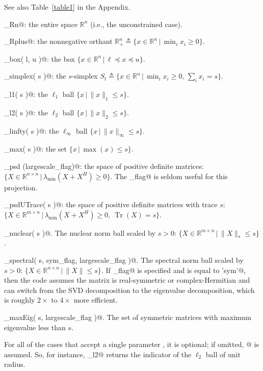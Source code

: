 \documentclass{article}
\newcommand{\<}{\langle}
\renewcommand{\>}{\rangle}
\newcommand{\R}{\mathbb{R}}
\begin{document}
See also Table~\ref{table1} in the Appendix. %
\begin{trivlist}
\item \verb@proj_Rn@: the entire space $\R^n$ (i.e., the unconstrained case).
\item \verb@proj_Rplus@: the nonnegative orthant $\R^n_+\triangleq\{x\in\R^n\,|\,\min_i x_i\geq 0\}$.
\item \verb@proj_box( l, u )@: the box $\{x\in\R^n\,|\,\ell\preceq x \preceq u\}$.
\item \verb@proj_simplex( s )@: the $s$-simplex $S_t\triangleq\{x\in\R^n\,|\,\min_i x_i\geq 0,\,\sum_i x_i=s\}$.
\item \verb@proj_l1( s )@: the $\ell_1$ ball $\{x\,|\,\|x\|_1\leq s \}$.
\item \verb@proj_l2( s )@: the $\ell_2$ ball $\{x\,|\,\|x\|_2\leq s \}$.
\item \verb@proj_linfty( s )@: the $\ell_\infty$ ball $\{x\,|\,\|x\|_\infty\leq s \}$.
\item \verb@proj_max( s )@: the set $\{x\,|\, \max(x) \leq s \}$.
\item \verb@proj_psd (largescale_flag)@: the space of positive definite matrices: $\{X\in\R^{n\times n}\,|\,\lambda_{\min}(X+X^H)\geq 0\}$. The \verb@largescale_flag@ is seldom useful for this projection.
\item \verb@proj_psdUTrace( s )@: the space of positive definite matrices with trace $s$: $\{X\in\R^{m\times n}\,|\,\lambda_{\min}(X+X^H)\geq 0,~\mathop{\textrm{Tr}}(X)=s\}$.
\item \verb@proj_nuclear( s )@. The nuclear norm ball scaled by $s>0$: 
    $\{X\in\R^{m\times n}\,|\,\|X\|_* \le s \}$. %
\item \verb@proj_spectral( s, sym_flag, largescale_flag )@. The spectral norm ball scaled by $s>0$: 
    $\{X\in\R^{n\times n}\,|\,\|X\| \le s \}$. %
    If \verb@sym_flag@ is specified and is equal to \verb@'sym'@, then the code
    assumes the matrix is real-symmetric or complex-Hermitian and can switch
    from the SVD decomposition to the eigenvalue decomposition, which is
    roughly $2\times$ to $4\times$ more efficient.
\item \verb@proj_maxEig( s, largescale_flag )@. The set of symmetric matrices with maximum eigenvalue less than $s$.
\end{trivlist}
For all of the cases that accept a single parameter \verb@s@, it is
optional; if omitted, @ is assumed. So, for instance,
\verb@proj_l2@ returns the indicator of the $\ell_2$ ball of unit
radius.
\end{document}
